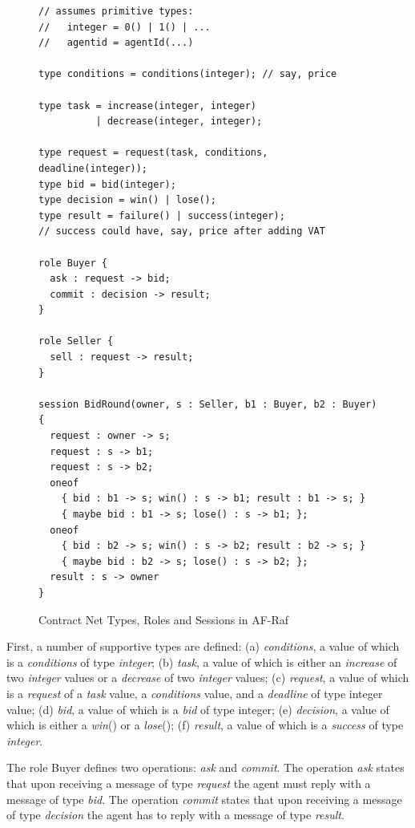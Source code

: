 \documentclass[a4paper,12pt,oneside,fleqn]{book} %
\begin{document}
\begin{figure}\footnotesize %
\begin{verbatim}
// assumes primitive types:
//   integer = 0() | 1() | ...
//   agentid = agentId(...)

type conditions = conditions(integer); // say, price

type task = increase(integer, integer)
          | decrease(integer, integer);

type request = request(task, conditions, deadline(integer));
type bid = bid(integer);
type decision = win() | lose();
type result = failure() | success(integer);
// success could have, say, price after adding VAT

role Buyer {
  ask : request -> bid;
  commit : decision -> result;
}

role Seller {
  sell : request -> result;
}

session BidRound(owner, s : Seller, b1 : Buyer, b2 : Buyer) {
  request : owner -> s;
  request : s -> b1;
  request : s -> b2;
  oneof
    { bid : b1 -> s; win() : s -> b1; result : b1 -> s; }
    { maybe bid : b1 -> s; lose() : s -> b1; };
  oneof
    { bid : b2 -> s; win() : s -> b2; result : b2 -> s; }
    { maybe bid : b2 -> s; lose() : s -> b2; };
  result : s -> owner
}
\end{verbatim}
\caption{Contract Net Types, Roles and Sessions in AF-Raf}
\label{fig:contract-roles}
\end{figure} %

First, a number of supportive types are defined: (a) \textit{conditions}, a
value of which is a \textit{conditions} of type \textit{integer}; (b)
\textit{task}, a value of which is either an \textit{increase} of two
\textit{integer} values or a \textit{decrease} of two \textit{integer}
values; (c) \textit{request}, a value of which is a \textit{request} of a
\textit{task} value, a \textit{conditions} value, and a \textit{deadline}
of type integer value; (d) \textit{bid}, a value of which is a \textit{bid}
of type integer; (e) \textit{decision}, a value of which is either a
\textit{win}() or a \textit{lose}(); (f) \textit{result}, a value of which
is a \textit{success} of type \textit{integer}.

The role Buyer defines two operations: \textit{ask} and \textit{commit}.
The operation \textit{ask} states that upon receiving a message of type
\textit{request} the agent must reply with a message of type \textit{bid}.
The operation \textit{commit} states that upon receiving a message of type
\textit{decision} the agent has to reply with a message of type
\textit{result}.
\end{document}
